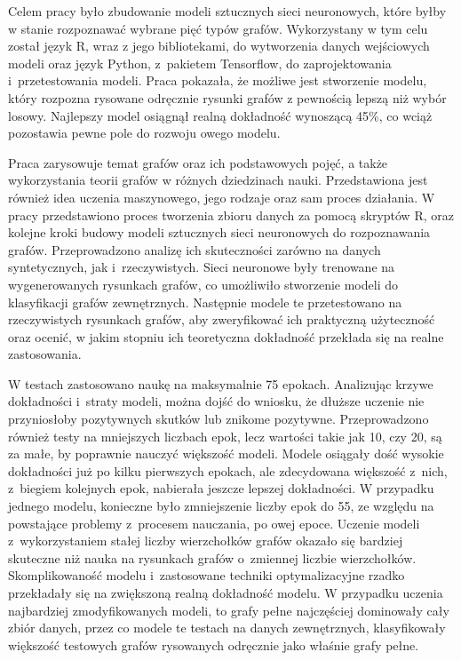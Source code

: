 Celem pracy było zbudowanie modeli sztucznych sieci neuronowych,
które byłby w stanie rozpoznawać wybrane pięć typów grafów.
Wykorzystany w tym celu został język R, wraz z jego bibliotekami, do wytworzenia danych wejściowych modeli
oraz język Python, z~pakietem Tensorflow, do zaprojektowania i~przetestowania modeli.
Praca pokazała, że możliwe jest stworzenie modelu, który rozpozna rysowane odręcznie rysunki grafów
z pewnością lepszą niż wybór losowy.
Najlepszy model osiągnął realną dokładność wynoszącą 45\%,
co wciąż pozostawia pewne pole do rozwoju owego modelu.

Praca zarysowuje temat grafów oraz ich podstawowych pojęć,
a także wykorzystania teorii grafów w różnych dziedzinach nauki.
Przedstawiona jest również idea uczenia maszynowego,
jego rodzaje oraz sam proces działania.
W pracy przedstawiono proces tworzenia zbioru danych za pomocą skryptów R,
oraz kolejne kroki budowy modeli sztucznych sieci neuronowych do rozpoznawania grafów.
Przeprowadzono analizę ich skuteczności zarówno na danych syntetycznych, jak i~rzeczywistych.
Sieci neuronowe były trenowane na wygenerowanych rysunkach grafów,
co umożliwiło stworzenie modeli do klasyfikacji grafów zewnętrznych.
Następnie modele te przetestowano na rzeczywistych rysunkach grafów,
aby zweryfikować ich praktyczną użyteczność oraz ocenić,
w jakim stopniu ich teoretyczna dokładność przekłada się na realne zastosowania.

W testach zastosowano naukę na maksymalnie 75 epokach.
Analizując krzywe dokładności i~straty modeli, można dojść do wniosku,
że dłuższe uczenie nie przyniosłoby pozytywnych skutków lub znikome pozytywne.
Przeprowadzono również testy na mniejszych liczbach epok, lecz wartości takie jak 10, czy 20,
są za małe, by poprawnie nauczyć większość modeli.
Modele osiągały dość wysokie dokładności już po kilku pierwszych epokach,
ale zdecydowana większość z~nich, z~biegiem kolejnych epok, nabierała jeszcze lepszej dokładności.
W przypadku jednego modelu, konieczne było zmniejszenie liczby epok do 55,
ze względu na powstające problemy z~procesem nauczania, po owej epoce.
Uczenie modeli z~wykorzystaniem stałej liczby wierzchołków grafów okazało się bardziej skuteczne
niż nauka na rysunkach grafów o~zmiennej liczbie wierzchołków.
Skomplikowaność modelu i~zastosowane techniki optymalizacyjne rzadko przekładały się na zwiększoną realną dokładność modelu.
W przypadku uczenia najbardziej zmodyfikowanych modeli, to grafy pełne najczęściej dominowały cały zbiór danych,
przez co modele te testach na danych zewnętrznych,
klasyfikowały większość testowych grafów rysowanych odręcznie jako właśnie grafy pełne.

